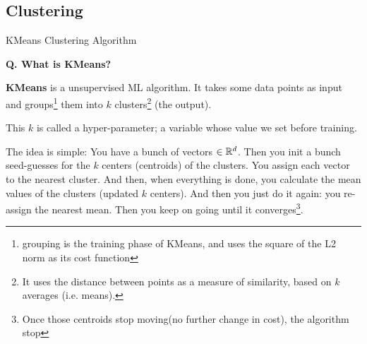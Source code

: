 
\subsection{Clustering}
\begin{transitionsubframe}
  \begin{center}
    \Huge KMeans Clustering Algorithm
  \end{center}
\end{transitionsubframe}


\begin{frame}[fragile]{\textbf{Q. What is KMeans?}}
  \begin{wideitemize}
  \item \textbf{KMeans} is a unsupervised ML algorithm. It takes some data
    points as input and groups\footnote{grouping is the training phase of KMeans,
      and uses the square of the L2 norm as its cost function} them into $k$
    clusters\footnote{It uses the distance between points as a measure of
      similarity, based on $k$ averages (i.e. means).} (the output).\medskip
  \begin{wideitemize}
    \item This $k$ is called a hyper-parameter; a variable whose value we set
      before training.
    \item The idea is simple: You have a bunch of vectors $\in {\Bbb R}^{d}$.
      Then you init a bunch seed-guesses for the $k$ centers (centroids) of the
      clusters. You assign each vector to the nearest cluster. And then, when
      everything is done, you calculate the mean values of the clusters (updated $k$
      centers). And then you just do it again: you re-assign the nearest mean. Then
      you keep on going until it converges\footnote{Once those centroids stop
        moving(no further change in cost), the algorithm stop}.
  \end{wideitemize}
  \end{wideitemize}
\end{frame}

